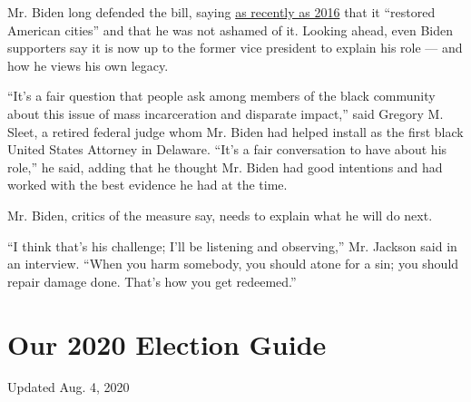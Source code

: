 Mr. Biden long defended the bill, saying
\href{https://www.cnbc.com/2016/04/19/institutional-racism-the-problem-not-crime-bill-biden.html}{as
recently as 2016} that it ``restored American cities'' and that he was
not ashamed of it. Looking ahead, even Biden supporters say it is now up
to the former vice president to explain his role --- and how he views
his own legacy.

``It's a fair question that people ask among members of the black
community about this issue of mass incarceration and disparate impact,''
said Gregory M. Sleet, a retired federal judge whom Mr. Biden had helped
install as the first black United States Attorney in Delaware. ``It's a
fair conversation to have about his role,'' he said, adding that he
thought Mr. Biden had good intentions and had worked with the best
evidence he had at the time.

Mr. Biden, critics of the measure say, needs to explain what he will do
next.

``I think that's his challenge; I'll be listening and observing,'' Mr.
Jackson said in an interview. ``When you harm somebody, you should atone
for a sin; you should repair damage done. That's how you get redeemed.''

\hypertarget{our-2020-election-guide}{%
\section{Our 2020 Election Guide}\label{our-2020-election-guide}}

Updated Aug. 4, 2020

